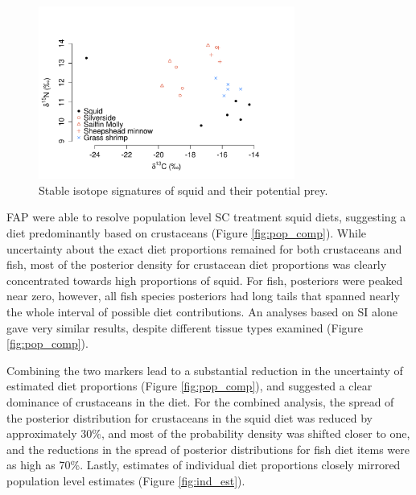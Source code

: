 \documentclass[fleqn,10pt]{wlpeerj}
\begin{document}
\begin{figure}
  \begin{center}   
      \includegraphics[width=0.75\textwidth]{figures/SI_plot.pdf}
       \caption{Stable isotope signatures of squid and their potential prey.}
    \label{fig:squid_SI}
  \end{center}
\end{figure}

FAP were able to resolve population level SC treatment squid diets,
suggesting a diet predominantly based on crustaceans
(Figure \ref{fig:pop_comp}). While uncertainty about the exact diet
proportions remained for both crustaceans and fish, most of the
posterior density for crustacean diet proportions was clearly
concentrated towards high
proportions of squid. For fish, posteriors were peaked near zero,
however, all fish species posteriors had long tails that spanned
nearly the whole interval of possible diet contributions. An analyses
based on SI alone gave very similar results, despite different tissue
types examined (Figure \ref{fig:pop_comp}). 

Combining the two markers lead to a substantial reduction in the
uncertainty of estimated diet proportions (Figure \ref{fig:pop_comp}),
and suggested a clear dominance of crustaceans in the diet. For the
combined analysis, the spread of the posterior distribution for crustaceans in the
squid diet was reduced by approximately 30\%, and most of the
probability density was shifted closer to one, and the reductions in
the spread of posterior distributions for fish diet items were as high
as 70\%. Lastly, estimates of individual diet proportions closely
mirrored population level estimates (Figure \ref{fig:ind_est}).
\end{document}
